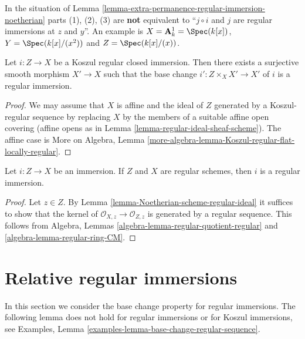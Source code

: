 \begin{remark}
\label{remark-not-always-extra-permanence}
In the situation of
Lemma \ref{lemma-extra-permanence-regular-immersion-noetherian}
parts (1), (2), (3) are {\bf not} equivalent to
``$j \circ i$ and $j$ are regular immersions at $z$ and $y$''.
An example is $X = \mathbf{A}^1_k = \Spec(k[x])$,
$Y = \Spec(k[x]/(x^2))$ and $Z = \Spec(k[x]/(x))$.
\end{remark}

\begin{lemma}
\label{lemma-koszul-regular-smooth-locally-regular}
Let $i : Z \to X$ be a Koszul regular closed immersion.
Then there exists a surjective smooth morphism $X' \to X$ such
that the base change $i' : Z \times_X X' \to X'$ of $i$ is
a regular immersion.
\end{lemma}

\begin{proof}
We may assume that $X$ is affine and the ideal of $Z$ generated by
a Koszul-regular sequence by replacing $X$ by the members of a suitable
affine open covering (affine opens as in
Lemma \ref{lemma-regular-ideal-sheaf-scheme}).
The affine case is
More on Algebra,
Lemma \ref{more-algebra-lemma-Koszul-regular-flat-locally-regular}.
\end{proof}

\begin{lemma}
\label{lemma-immersion-regular-regular-immersion}
Let $i : Z \to X$ be an immersion. If $Z$ and $X$ are
regular schemes, then $i$ is a regular immersion.
\end{lemma}

\begin{proof}
Let $z \in Z$. By Lemma \ref{lemma-Noetherian-scheme-regular-ideal}
it suffices to show that the kernel of
$\mathcal{O}_{X, z} \to \mathcal{O}_{Z, z}$
is generated by a regular sequence. This follows from
Algebra, Lemmas \ref{algebra-lemma-regular-quotient-regular} and
\ref{algebra-lemma-regular-ring-CM}.
\end{proof}





\section{Relative regular immersions}
\label{section-relative-regular-immersion}

\noindent
In this section we consider the base change property for regular immersions.
The following lemma does not hold for regular immersions
or for Koszul immersions, see
Examples, Lemma \ref{examples-lemma-base-change-regular-sequence}.


